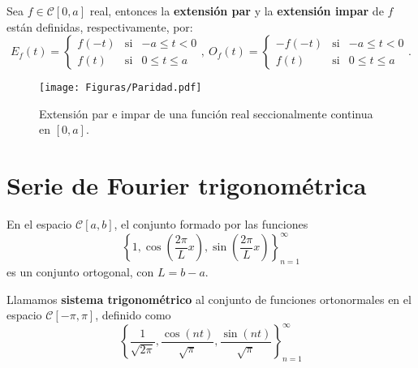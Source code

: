 \begin{defi} 
Sea $f \in \mathscr{C}[0,a]$ real, entonces la \textbf{extensión par} y la \textbf{extensión impar} de $f$ están definidas, respectivamente, por:
\begin{equation*}
    E_f(t) = \left\{ \begin{array}{cll}
    f(-t)     & \mbox{si} & -a \leq t < 0 \\
    f(t)     & \mbox{si} & 0 \leq t \leq a
    \end{array} \right. , ~ O_f(t) = \left\{ \begin{array}{cll}
    -f(-t)     & \mbox{si} & -a \leq t < 0 \\
    f(t)     & \mbox{si} & 0 \leq t \leq a
    \end{array} \right. .
\end{equation*}
\end{defi}

\begin{figure}[H]
    \centering
    \texttt{[image: Figuras/Paridad.pdf]}
    \caption{Extensión par e impar de una función real seccionalmente continua en $[0,a]$. }
\end{figure}

\section{Serie de Fourier trigonométrica}


\begin{propo}
    En el espacio $\mathscr{C}[a,b]$, el conjunto formado por las funciones
    $$\left\{ 1, \cos\left( \frac{2\pi}{L}x \right), \sin\left( \frac{2\pi}{L}x \right) \right\}_{n=1}^{\infty}$$
    es un conjunto ortogonal, con $L = b-a$.
\end{propo}


\begin{defi} 
    Llamamos \textbf{sistema trigonométrico} al conjunto de funciones ortonormales en el espacio $\mathscr{C}[-\pi,\pi]$, definido como
    $$\left\{ \frac{1}{\sqrt{2\pi}}, \frac{\cos(nt)}{\sqrt{\pi}}, \frac{\sin(nt)}{\sqrt{\pi}} \right\}_{n=1}^{\infty}$$
\end{defi}

